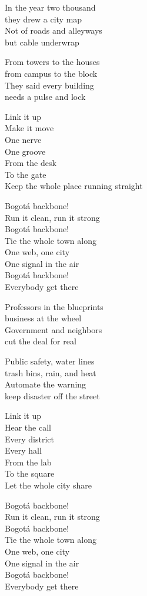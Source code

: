 \begin{lyrics}
In the year two thousand\\
they drew a city map\\
Not of roads and alleyways\\
but cable underwrap

From towers to the houses\\
from campus to the block\\
They said every building\\
needs a pulse and lock

Link it up\\
Make it move\\
One nerve\\
One groove\\
From the desk\\
To the gate\\
Keep the whole place running straight

Bogotá backbone!\\
Run it clean, run it strong\\
Bogotá backbone!\\
Tie the whole town along\\
One web, one city\\
One signal in the air\\
Bogotá backbone!\\
Everybody get there

Professors in the blueprints\\
business at the wheel\\
Government and neighbors\\
cut the deal for real

Public safety, water lines\\
trash bins, rain, and heat\\
Automate the warning\\
keep disaster off the street

Link it up\\
Hear the call\\
Every district\\
Every hall\\
From the lab\\
To the square\\
Let the whole city share

Bogotá backbone!\\
Run it clean, run it strong\\
Bogotá backbone!\\
Tie the whole town along\\
One web, one city\\
One signal in the air\\
Bogotá backbone!\\
Everybody get there


\end{lyrics}
